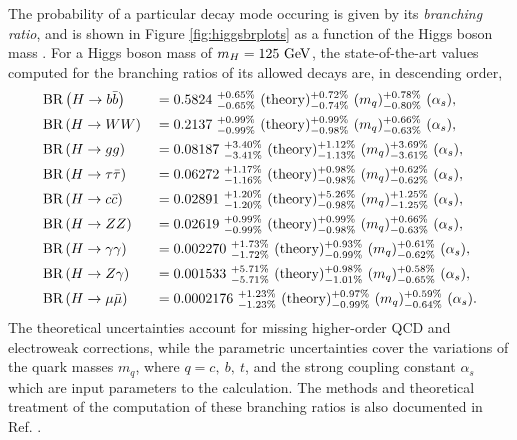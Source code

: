 The probability of a particular decay mode occuring is given by its \textit{branching ratio}, and is shown in Figure \ref{fig:higgsbrplots} as a function of the Higgs boson mass \massH. For a Higgs boson mass of $m_{H} = 125\ \mathrm{GeV}$, the state-of-the-art values computed for the branching ratios of its allowed decays are, in descending order,
\begin{alignat*}{2}
  &\textrm{BR}\left( H \rightarrow b\bar{b} \right) &&= 0.5824\ {}_{-0.65\%}^{+0.65\%}\ (\mathrm{theory}) {}_{-0.74\%}^{+0.72\%}\ (m_{q}) {}_{-0.80\%}^{+0.78\%}\ (\alpha_{s}), \\
  &\textrm{BR}\left( H \rightarrow WW \right) &&= 0.2137\ {}_{-0.99\%}^{+0.99\%}\ (\mathrm{theory}) {}_{-0.98\%}^{+0.99\%}\ (m_{q}) {}_{-0.63\%}^{+0.66\%}\ (\alpha_{s}), \\
  &\textrm{BR}\left( H \rightarrow gg \right) &&= 0.08187\ {}_{-3.41\%}^{+3.40\%}\ (\mathrm{theory}) {}_{-1.13\%}^{+1.12\%}\ (m_{q}) {}_{-3.61\%}^{+3.69\%}\ (\alpha_{s}), \\
  &\textrm{BR}\left( H \rightarrow \tau\bar{\tau} \right) &&= 0.06272\ {}_{-1.16\%}^{+1.17\%}\ (\mathrm{theory}) {}_{-0.98\%}^{+0.98\%}\ (m_{q}) {}_{-0.62\%}^{+0.62\%}\ (\alpha_{s}), \\
  &\textrm{BR}\left( H \rightarrow c\bar{c} \right) &&= 0.02891\ {}_{-1.20\%}^{+1.20\%}\ (\mathrm{theory}) {}_{-0.98\%}^{+5.26\%}\ (m_{q}) {}_{-1.25\%}^{+1.25\%}\ (\alpha_{s}), \\
  &\textrm{BR}\left( H \rightarrow ZZ \right) &&= 0.02619\ {}_{-0.99\%}^{+0.99\%}\ (\mathrm{theory}) {}_{-0.98\%}^{+0.99\%}\ (m_{q}) {}_{-0.63\%}^{+0.66\%}\ (\alpha_{s}), \\
  &\textrm{BR}\left( H \rightarrow \gamma\gamma \right) &&= 0.002270\ {}_{-1.72\%}^{+1.73\%}\ (\mathrm{theory}) {}_{-0.99\%}^{+0.93\%}\ (m_{q}) {}_{-0.62\%}^{+0.61\%}\ (\alpha_{s}), \\
  &\textrm{BR}\left( H \rightarrow Z\gamma \right) &&= 0.001533\ {}_{-5.71\%}^{+5.71\%}\ (\mathrm{theory}) {}_{-1.01\%}^{+0.98\%}\ (m_{q}) {}_{-0.65\%}^{+0.58\%}\ (\alpha_{s}), \\
  &\textrm{BR}\left( H \rightarrow \mu\bar{\mu} \right) &&= 0.0002176\ {}_{-1.23\%}^{+1.23\%}\ (\mathrm{theory}) {}_{-0.99\%}^{+0.97\%}\ (m_{q}) {}_{-0.64\%}^{+0.59\%}\ (\alpha_{s}).
\end{alignat*}
The theoretical uncertainties account for missing higher-order QCD and electroweak corrections, while the parametric uncertainties cover the variations of the quark masses $m_{q}$, where $q = c,\ b,\ t$, and the strong coupling constant $\alpha_{s}$ which are input parameters to the calculation. The methods and theoretical treatment of the computation of these branching ratios is also documented in Ref. \cite{CERNYR4}.

